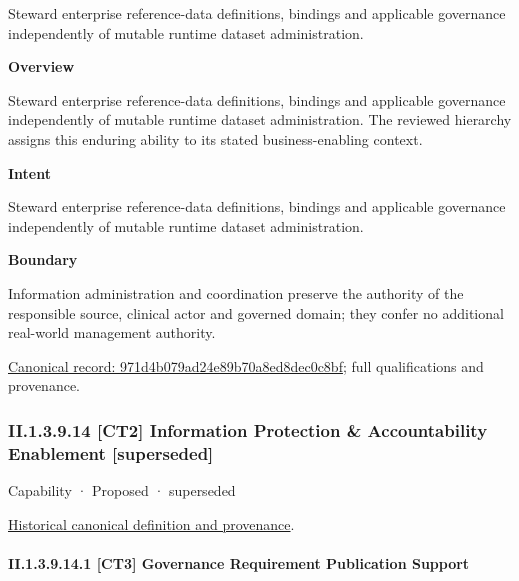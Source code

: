 Steward enterprise reference-data definitions, bindings and applicable governance independently of mutable runtime dataset administration.



\textbf{Overview}



Steward enterprise reference-data definitions, bindings and applicable governance independently of mutable runtime dataset administration. The reviewed hierarchy assigns this enduring ability to its stated business-enabling context.



\textbf{Intent}



Steward enterprise reference-data definitions, bindings and applicable governance independently of mutable runtime dataset administration.



\textbf{Boundary}



Information administration and coordination preserve the authority of the responsible source, clinical actor and governed domain; they confer no additional real-world management authority.


{\footnotesize \href{../../../../continuum/strategy/capability/971d4b079ad24e89b70a8ed8dec0c8bf.md}{Canonical record: 971d4b079ad24e89b70a8ed8dec0c8bf}; full qualifications and provenance.}\par
\subsubsection*{II.1.3.9.14 [CT2] Information Protection \& Accountability Enablement [superseded]}
\label{navigation:II.1.3.9.14}

\label{element:e922cba7cf1d4ebeb9abf6472a3803ce}
{\small Capability · Proposed · superseded}\par
\href{../../../../continuum/strategy/capability/e922cba7cf1d4ebeb9abf6472a3803ce.md}{Historical canonical definition and provenance}.\par
\paragraph*{II.1.3.9.14.1 [CT3] Governance Requirement Publication Support}
\label{navigation:II.1.3.9.14.1}

